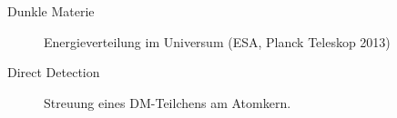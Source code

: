 \begin{frame}{Dunkle Materie}
	\begin{figure}
	\centering
	\caption{Energieverteilung im Universum (ESA, Planck Teleskop 2013)}
\end{figure}
\end{frame}

\begin{frame}{Direct Detection}
	\begin{figure}[H]
		\resizebox{.6\textwidth}{!}{
			
		}
		\caption{Streuung eines DM-Teilchens am Atomkern.}
	\end{figure}
\end{frame}